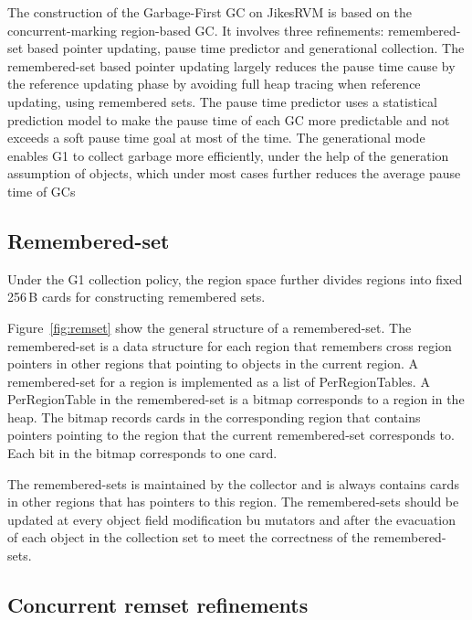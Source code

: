 The construction of the Garbage-First GC on JikesRVM is based on the concurrent-marking
region-based GC.
It involves three refinements: remembered-set based pointer updating, pause time predictor and generational collection.
The remembered-set based pointer updating largely reduces the pause time cause by
the reference updating phase by avoiding full heap tracing when reference updating,
using remembered sets. The pause time predictor uses a statistical prediction model to make the pause time of each
GC more predictable and not exceeds a soft pause time goal at most of the time.
The generational mode enables G1 to collect garbage more efficiently, under the help
of the generation assumption of objects, which under most cases
further reduces the average pause  time of GCs

\subsection{Remembered-set}

Under the G1 collection policy, the region space further divides regions into fixed 256\,B cards for constructing remembered sets.

Figure~\ref{fig:remset} show the general structure of a remembered-set. The remembered-set is a data structure for each region that remembers cross
region pointers in other regions that pointing to objects in the current region.
A remembered-set for a region is implemented as a list of PerRegionTables.
A PerRegionTable in the remembered-set is a bitmap corresponds to a region in the heap.
The bitmap records cards in the corresponding region that contains pointers pointing to the
region that the current remembered-set corresponds to. Each bit in the bitmap corresponds to one card.

\begin{figure*}
  \centering
  \texttt{[image: \{figs/remset.png]}}
  \caption{Remembered-Set Structure}
  \label{fig:remset}
\end{figure*}

The remembered-sets is maintained by the collector and is always contains cards in other regions that has pointers to this region.
The remembered-sets should be updated at every object field modification bu mutators and after
the evacuation of each object in the collection set to meet the correctness of the remembered-sets.

\subsection{Concurrent remset refinements}

